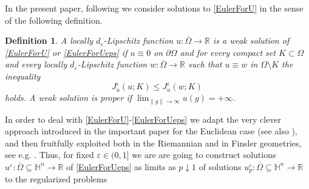 \documentclass[10pt]{amsart}
\numberwithin{equation}{section}
\newtheorem{definition}[theorem]{Definition}
\theoremstyle{definition}
\newcommand{\R}{{\mathbb R}}
\newcommand{\He}{\mathbb{H}}
\begin{document}


In the present paper, following \cite{HuiskenIlmanen} we consider solutions to \eqref{EulerForU} in the sense of the following definition.

\begin{definition}
\label{def:solution}
A locally $d_\varepsilon$-Lipschitz function $u:\overline{\Omega} \to \mathbb{R}$ is a weak solution of \eqref{EulerForU} or \eqref{EulerForUeps} if $u\equiv 0$ on $\partial \Omega$ and for every compact set $K \subset \Omega$ and every locally $d_\varepsilon$-Lipschitz function $w:\overline{\Omega} \to \mathbb{R}$ such that $u\equiv w$ in $\Omega \setminus K$ the inequality 
\begin{equation}
	\label{Ju-inequality}
	J^\varepsilon_u(u;K) \leq J^\varepsilon_u(w;K) \,  
\end{equation} 	
holds. A weak solution is \rm{proper} if $\displaystyle{\lim_{\|g\| \to \infty} u(g)=+\infty}$.
\end{definition}
\vskip10pt
 
 In order to deal with  \eqref{EulerForU}-\eqref{EulerForUeps} we adapt the very clever approach introduced in the important paper \cite{Moser} for the Euclidean case (see also \cite{Moser2}), and then fruitfully exploited both in the Riemannian and in Finsler geometries, see e.g. \cite{Mazzieri, Mazzieri4, Rigoli, Xia, DellaPietra, Cabezas}. Thus, for fixed $\varepsilon \in (0,1]$ we are are going to construct solutions $u^\varepsilon:\overline{\Omega} \subseteq \He^n \to \R$ of \eqref{EulerForUeps} as limits as $p \downarrow 1$ of solutions  $u^\varepsilon_{p}:\overline{\Omega} \subseteq \He^n \to \R$ to the regularized problems 
\end{document}
